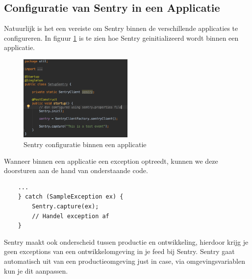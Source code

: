 \subsection{Configuratie van Sentry in een Applicatie}
Natuurlijk is het een vereiste om Sentry binnen de verschillende applicaties te configureren. In figuur \ref{fig:SentryApplicatieConfiguratie} is te zien hoe Sentry geinitializeerd wordt binnen een applicatie.
\begin{figure}[H]
	\centering
	\includegraphics[width=0.50\textwidth]{img/SentryApplicatieConfiguratie.png}
	\caption{Sentry configuratie binnen een applicatie}
	\label{fig:SentryApplicatieConfiguratie}
\end{figure}
Wanneer binnen een applicatie een exception optreedt, kunnen we deze doorsturen aan de hand van onderstaande code.
\begin{lstlisting}
	... 
	} catch (SampleException ex) {
		Sentry.capture(ex);
		// Handel exception af
	}
\end{lstlisting}
Sentry maakt ook onderscheid tussen productie en ontwikkeling, hierdoor krijg je geen exceptions van een ontwikkelomgeving in je feed bij Sentry.
Sentry gaat automatisch uit van een productieomgeving just in case, via omgevingsvariablen kun je dit aanpassen.